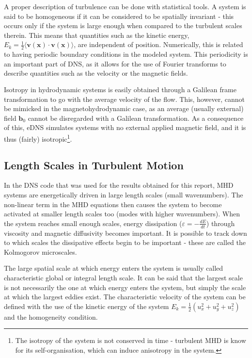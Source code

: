 \documentclass[a4paper,12pt]{article}
\begin{document}
A proper description of turbulence can be done with statistical tools. A system is said to be homogeneous if it can be considered to be spatially invariant - this occurs only if the system is large enough when compared to the turbulent scales therein. This means that quantities such as the kinetic energy, $E_k = \frac{1}{2} \langle \bm v(\bm x) \cdot \bm v(\bm x) \rangle$, are independent of position. Numerically, this is related to having periodic boundary conditions in the modeled system. This periodicity is an important part of DNS, as it allows for the use of Fourier transforms to describe quantities such as the velocity or the magnetic fields. 

Isotropy in hydrodynamic systems is easily obtained through a Galilean frame transformation to go with the average velocity of the flow. This, however, cannot be mimicked in the magnetohydrodynamic case, as an average (usually external) field $\bm b_0$ cannot be disregarded with a Galilean transformation. As a consequence of this, eDNS simulates systems with no external applied magnetic field, and it is thus (fairly) isotropic\footnote{The isotropy of the system is not conserved in time - turbulent MHD is know for its self-organisation, which can induce anisotropy in the system.}.

\subsection{Length Scales in Turbulent Motion}

In the DNS code that was used for the results obtained for this report, MHD systems are energetically driven in large length scales (small wavenumbers). The non-linear term in the MHD equations then causes the system to become activated at smaller length scales too (modes with higher wavenumbers). When the system reaches small enough scales, energy dissipation ($\varepsilon = - \frac{dE}{dt}$) through viscosity and magnetic diffusivity becomes important. It is possible to track down to which scales the dissipative effects begin to be important - these are called the Kolmogorov microscales. 

The large spatial scale at which energy enters the system is usually called characteristic global or integral length scale. It can be said that the largest scale is not necessarily the one at which energy enters the system, but simply the scale at which the largest eddies exist. The characteristic velocity of the system can be defined with the use of the kinetic energy of the system $E_k = \frac{1}{2}(u_x^2+u_y^2+u_z^2)$ and the homogeneity condition. 
\end{document}
